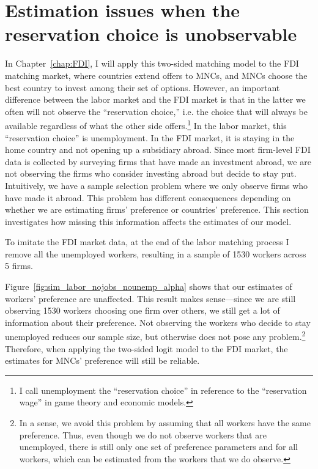 \section{Estimation issues when the reservation choice is unobservable}
\label{sec:reservation_choice}

In Chapter~\ref{chap:FDI}, I will apply this two-sided matching model to the FDI
matching market, where countries extend offers to MNCs, and MNCs choose the best
country to invest among their set of options. However, an important difference
between the labor market and the FDI market is that in the latter we often will
not observe the ``reservation choice,'' i.e. the choice that will always be
available regardless of what the other side offers.\footnote{I call unemployment
  the ``reservation choice'' in reference to the ``reservation wage'' in game
  theory and economic models.} In the labor market, this ``reservation choice''
is unemployment. In the FDI market, it is staying in the home country and not
opening up a subsidiary abroad. Since most firm-level FDI data is collected by
surveying firms that have made an investment abroad, we are not observing the
firms who consider investing abroad but decide to stay put. Intuitively, we have
a sample selection problem where we only observe firms who have made it abroad.
This problem has different consequences depending on whether we are estimating
firms' preference or countries' preference. This section investigates how
missing this information affects the estimates of our model.

To imitate the FDI market data, at the end of the labor matching process I
remove all the unemployed workers, resulting in a sample of 1530 workers across
5 firms.

Figure~\ref{fig:sim_labor_nojobs_nounemp_alpha} shows that our estimates of
workers' preference are unaffected. This result makes sense---since we are still
observing 1530 workers choosing one firm over others, we still get a lot of
information about their preference. Not observing the workers who decide to stay
unemployed reduces our sample size, but otherwise does not pose any
problem.\footnote{In a sense, we avoid this problem by assuming that all workers
  have the same preference. Thus, even though we do not observe workers that are
  unemployed, there is still only one set of preference parameters and for all
  workers, which can be estimated from the workers that we do observe.}
Therefore, when applying the two-sided logit model to the FDI market, the
estimates for MNCs' preference will still be reliable.

